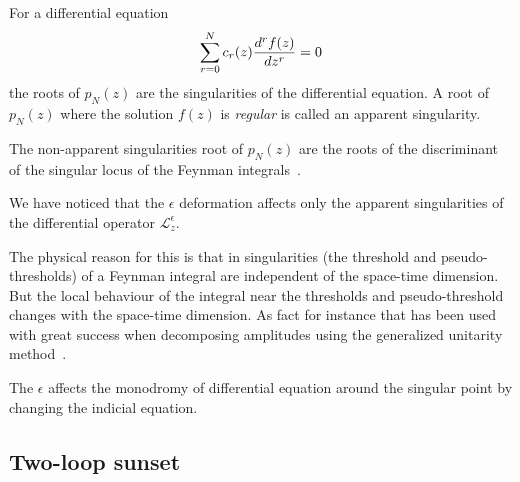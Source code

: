 \documentclass[a4paper,12pt]{article}
\numberwithin{equation}{section}
\numberwithin{figure}{section}
\begin{document}
For a differential equation
\begin{equation}
  \sum_{r=0}^N c_r(z) {d^rf(z)\over dz^r}=0  
\end{equation}
the roots of $p_N(z)$ are the singularities of the differential
equation. A root of $p_N(z)$ where the solution $f(z)$ is
\emph{regular} is called an apparent singularity.

The non-apparent singularities root of $p_N(z)$ are the roots of the
discriminant of the singular locus of the Feynman integrals~\cite{Doran:2023yzu}.

We have noticed that the $\epsilon$ deformation affects only the
apparent singularities of the differential operator $\mathscr{L}_z^\epsilon$.

The physical reason for this is that in singularities (the threshold
and pseudo-thresholds) of a Feynman integral are independent of the
space-time dimension.  But the local behaviour of the integral near
the thresholds and pseudo-threshold changes with the space-time
dimension.   As fact for instance that has been used with great success
when decomposing amplitudes using the generalized unitarity method~\cite{Bern:2011qt}.

The  $\epsilon$ affects the monodromy of differential equation around
the singular point by changing the indicial equation.





\subsection{Two-loop sunset}
\end{document}
